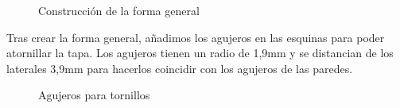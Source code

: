\begin{figure}[H]
\centering
{}
\caption{Construcción de la forma general}
\label{fig:forma_general_tapa_superior}
\end{figure}

Tras crear la forma general, añadimos los agujeros en las esquinas para poder atornillar la tapa. Los agujeros tienen un radio de 1,9mm y se distancian de los laterales 3,9mm para hacerlos coincidir con los agujeros de las paredes.

\begin{figure}[H]
\centering
{}
\caption{Agujeros para tornillos }
\label{fig:agujeros_tornillos_tapa_superior}
\end{figure}

